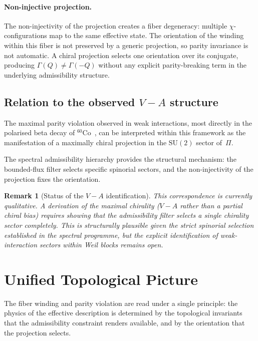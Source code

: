 \documentclass[11pt,a4paper]{article}
\newtheorem{remark}[theorem]{Remark}
\begin{document}
      \paragraph{Non-injective projection.}
        The non-injectivity of the projection creates a fiber degeneracy:
        multiple $\chi$-configurations map to the same effective state.
        The orientation of the winding within this fiber is not preserved
        by a generic projection, so parity invariance is not automatic.
        A chiral projection selects one orientation over its conjugate,
        producing $\Gamma(Q) \neq \Gamma(-Q)$ without any explicit
        parity-breaking term in the underlying admissibility structure.

  \subsection{Relation to the observed $V{-}A$ structure}

    The maximal parity violation observed in weak interactions,
    most directly in the polarised beta decay of
    ${}^{60}\mathrm{Co}$~\cite{Wu1957},
    can be interpreted within this framework as the manifestation of a
    maximally chiral projection in the $\mathrm{SU}(2)$ sector of~$\Pi$.

    The spectral admissibility hierarchy provides the structural
    mechanism: the bounded-flux filter selects specific spinorial sectors,
    and the non-injectivity of the projection fixes the orientation.

    \begin{remark}[Status of the $V{-}A$ identification]
      \label{rem:VA}
      This correspondence is currently qualitative.
      A derivation of the \emph{maximal} chirality ($V{-}A$ rather than a
      partial chiral bias) requires showing that the admissibility filter
      selects a single chirality sector completely.
      This is structurally plausible given the strict spinorial selection
      established in the spectral programme, but the explicit identification
      of weak-interaction sectors within Weil blocks remains open.
    \end{remark}

  \section{Unified Topological Picture}
  \label{sec:unified}

  The fiber winding and parity violation are read under a single principle:
  the physics of the effective description is determined by the
  topological invariants that the admissibility constraint renders
  available, and by the orientation that the projection selects.
\end{document}
